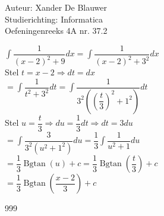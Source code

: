 \documentclass[a4paper]{article}
\begin{document}
\noindent \large Auteur: Xander De Blauwer \\
\noindent \large Studierichting: Informatica\\
\noindent \large Oefeningenreeks 4A nr. 37.2\\

\medskip

\normalsize

$ \displaystyle\int \dfrac{1}{(x - 2)^2 + 9}dx  = \displaystyle\int \dfrac{1}{(x - 2)^2 + 3^2}dx $ \\

Stel $t = x - 2 \Rightarrow dt = dx $ \\ 

$ = \displaystyle\int \dfrac{1}{t^2 + 3^2}dt = \displaystyle\int \dfrac{1}{3^2\left(\left(\dfrac{t}{3}\right)^2 + 1^2\right)} dt $ \\

Stel $ u = \dfrac{t}{3} \Rightarrow du = \dfrac{1}{3}dt \Rightarrow dt = 3du$ \\

$ =  \displaystyle\int \dfrac{3}{3^2(u^2 + 1^2)}du = \dfrac{1}{3} \displaystyle\int \dfrac{1}{u^2 + 1}du $ \\

$ = \dfrac{1}{3}\operatorname{Bgtan}(u) + c = \dfrac{1}{3}\operatorname{Bgtan}\left(\dfrac{t}{3}\right) + c $ \\

$  = \dfrac{1}{3}\operatorname{Bgtan}\left(\dfrac{x-2}{3}\right) + c $ \\






\begin{thebibliography}{999}
\end{thebibliography}
\end{document}
